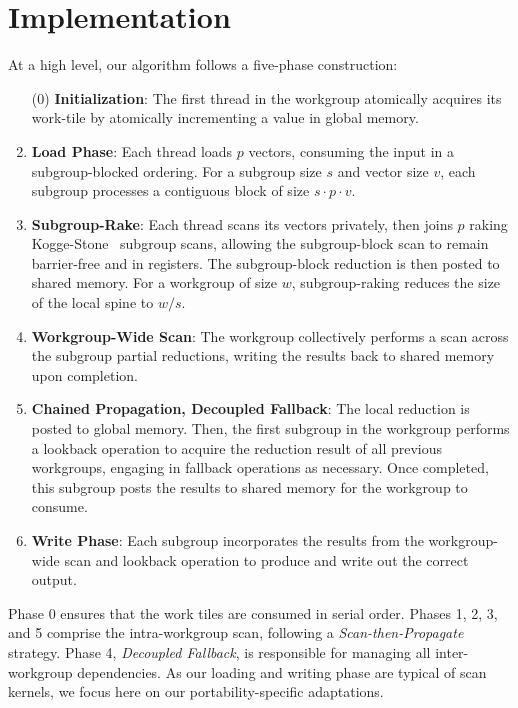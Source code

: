 \documentclass[acmsmall, manuscript, screen, review, anonymous]{acmart}
\begin{document}
\section{Implementation}
At a high level, our algorithm follows a five-phase construction:
\begin{enumerate}
  \item[(0)] \textbf {Initialization}: The first thread in the workgroup atomically acquires its work-tile by atomically incrementing a value in global memory.
  \item \textbf{Load Phase}: Each thread loads $p$ vectors, consuming the input in a subgroup-blocked ordering. For a subgroup size $s$ and vector size $v$, each subgroup processes a contiguous block of size $s \cdot p \cdot v$.
  \item \textbf{Subgroup-Rake}: Each thread scans its vectors privately, then joins $p$ raking Kogge-Stone~\cite{5009159} subgroup scans,
        allowing the subgroup-block scan to remain barrier-free and in registers. The subgroup-block reduction is then posted to shared memory. For a workgroup of size $w$, subgroup-raking reduces the size of the local spine to $w/s$.
  \item \textbf{Workgroup-Wide Scan}: The workgroup collectively performs a scan across the subgroup partial reductions, writing the results back to shared memory upon completion.
  \item \textbf{Chained Propagation, Decoupled Fallback}: The local reduction is posted to global memory. Then, the first subgroup in the workgroup performs a lookback operation to acquire the reduction result of all previous workgroups, engaging in fallback operations as necessary. Once completed, this subgroup posts the results to shared memory for the workgroup to consume.
  \item \textbf{Write Phase}: Each subgroup incorporates the results from the workgroup-wide scan and lookback operation to produce and write out the correct output.
\end{enumerate}
Phase 0 ensures that the work tiles are consumed in serial order. Phases 1, 2, 3, and 5 comprise the intra-workgroup scan, following a \emph{Scan-then-Propagate} strategy. Phase 4, \emph{Decoupled Fallback}, is responsible for managing all inter-workgroup dependencies. As our loading and writing phase are typical of scan kernels, we focus here on our portability-specific adaptations.
\end{document}
